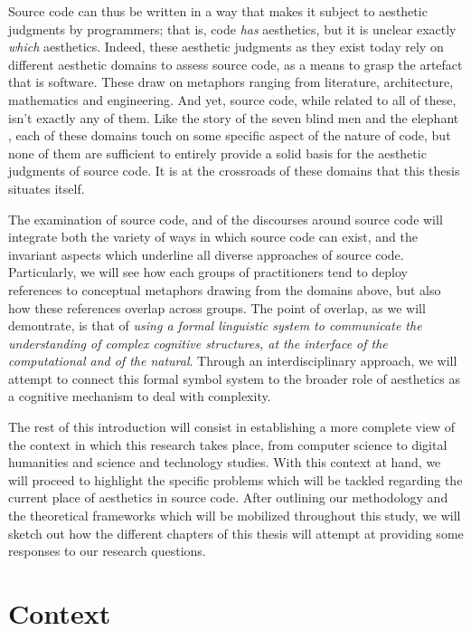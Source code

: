 Source code can thus be written in a way that makes it subject to aesthetic judgments by programmers; that is, code \emph{has} aesthetics, but it is unclear exactly \emph{which} aesthetics. Indeed, these aesthetic judgments as they exist today rely on different aesthetic domains to assess source code, as a means to grasp the artefact that is software. These draw on metaphors ranging from literature, architecture, mathematics and engineering. And yet, source code, while related to all of these, isn't exactly any of them. Like the story of the seven blind men and the elephant \citep{chun_sourcery_2008}, each of these domains touch on some specific aspect of the nature of code, but none of them are sufficient to entirely provide a solid basis for the aesthetic judgments of source code. It is at the crossroads of these domains that this thesis situates itself.

The examination of source code, and of the discourses around source code will integrate both the variety of ways in which source code can exist, and the invariant aspects which underline all diverse approaches of source code. Particularly, we will see how each groups of practitioners tend to deploy references to conceptual metaphors drawing from the domains above, but also how these references overlap across groups. The point of overlap, as we will demontrate, is that of \emph{using a formal linguistic system to communicate the understanding of complex cognitive structures, at the interface of the computational and of the natural}. Through an interdisciplinary approach, we will attempt to connect this formal symbol system to the broader role of aesthetics as a cognitive mechanism to deal with complexity.

The rest of this introduction will consist in establishing a more complete view of the context in which this research takes place, from computer science to digital humanities and science and technology studies. With this context at hand, we will proceed to highlight the specific problems which will be tackled regarding the current place of aesthetics in source code. After outlining our methodology and the theoretical frameworks which will be mobilized throughout this study, we will sketch out how the different chapters of this thesis will attempt at providing some responses to our research questions.

\section{Context}
\label{sec:context}

